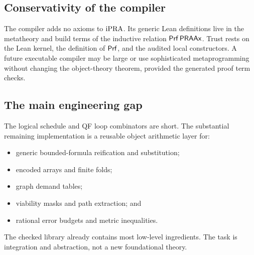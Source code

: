 \subsection{Conservativity of the compiler}

The compiler adds no axioms to \(\mathrm{iPRA}\).  Its generic Lean definitions live in the
metatheory and build terms of the inductive relation \(\mathsf{Prf}\,\mathsf{PRAAx}\).  Trust rests on
the Lean kernel, the definition of \(\mathsf{Prf}\), and the audited local constructors.  A
future executable compiler may be large or use sophisticated metaprogramming without
changing the object-theory theorem, provided the generated proof term checks.

\subsection{The main engineering gap}

The logical schedule and QF loop combinators are short.  The substantial remaining
implementation is a reusable object arithmetic layer for:

\begin{itemize}
\item generic bounded-formula reification and substitution;
\item encoded arrays and finite folds;
\item graph demand tables;
\item viability masks and path extraction; and
\item rational error budgets and metric inequalities.
\end{itemize}

The checked  library already contains most low-level ingredients.
The task is integration and abstraction, not a new foundational theory.
